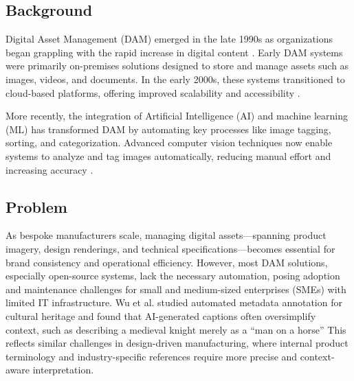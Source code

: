 \documentclass[a4paper,10pt,twocolumn]{article}
\numberwithin{figure}{section}
\numberwithin{table}{section}
\begin{document}
\subsection{Background}
Digital Asset Management (DAM) emerged in the late 1990s as organizations began grappling 
with the rapid increase in digital content \citep{krogh2009}. Early DAM systems were primarily on-premises 
solutions designed to store and manage assets such as images, videos, and documents. 
In the early 2000s, these systems transitioned to cloud-based platforms, offering 
improved scalability and accessibility \citep{mccain2021}.
\vspace{0.3cm}

More recently, the integration of Artificial Intelligence (AI) and machine learning (ML) has transformed 
DAM by automating key processes like image tagging, sorting, and categorization. Advanced computer 
vision techniques now enable systems to analyze and tag images automatically, 
reducing manual effort and increasing accuracy \citep{MINGfANG}.



\subsection{Problem}
As bespoke manufacturers scale, managing digital assets—spanning product imagery, design renderings,
and technical specifications—becomes essential for brand consistency and operational efficiency.
However, most DAM solutions, especially open-source systems, lack the necessary automation, 
posing adoption and maintenance challenges for small and medium-sized enterprises (SMEs) with limited IT infrastructure. 
Wu et al. studied automated metadata annotation for cultural heritage and found that AI-generated 
captions often oversimplify context, such as describing a medieval knight merely as a “man on a horse” \citep{MINGfANG} 
This reflects similar challenges in design-driven manufacturing, where internal product terminology and industry-specific 
references require more precise and context-aware interpretation.
\vspace{0.3cm}
\end{document}
